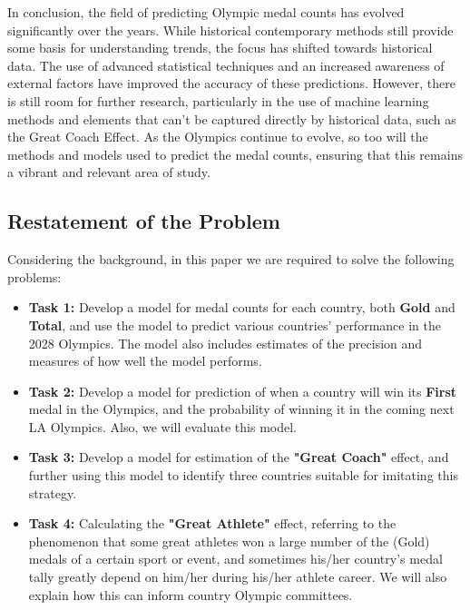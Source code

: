 In conclusion, the field of predicting Olympic medal counts has evolved significantly over the years. While historical contemporary methods still provide some basis for understanding trends, the focus has shifted towards historical data. The use of advanced statistical techniques and an increased awareness of external factors have improved the accuracy of these predictions\cite{4}. 
However, there is still room for further research, particularly in the use of machine learning methods and elements that can't be captured directly by historical data, such as the Great Coach Effect\cite{2}. As the Olympics continue to evolve, so too will the methods and models used to predict the medal counts, ensuring that this remains a vibrant and relevant area of study.

\subsection{Restatement of the Problem}
Considering the background, in this paper we are required to solve the following problems:

\begin{itemize}
\item{\bf Task 1:} Develop a model for medal counts for each country, both \textbf{Gold} and \textbf{Total}, and use the model to predict various countries' performance in the 2028 Olympics. The model also includes estimates of the precision and measures of how well the model performs.

\item{\bf Task 2:} Develop a model for prediction of when a country will win its \textbf{First} medal in the Olympics, and the probability of winning it in the coming next LA Olympics. Also, we will evaluate this model.

\item{\bf Task 3:} Develop a model for estimation of the \textbf{"Great Coach"} effect, and further using this model to identify three countries suitable for imitating this strategy.

\item{\bf Task 4:} Calculating the \textbf{"Great Athlete"} effect, referring to the phenomenon that some great athletes won a large number of the (Gold) medals of a certain sport or event, and sometimes his/her country's medal tally greatly depend on him/her during his/her athlete career. We will also explain how this can inform country Olympic committees.
\end{itemize}

